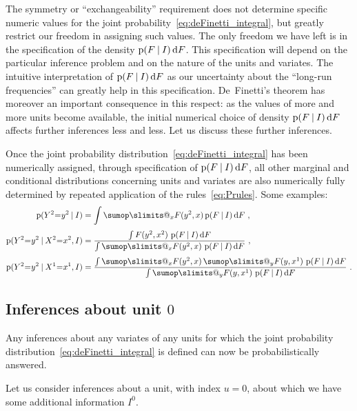 \documentclass[a4paper,12pt,%
onecolumn,oneside,article,%
british%
]{memoir}
\makeatletter
\def\sum{\DOTSI\sumop\slimits@}
\newcommand*{\di}{\mathop{}\!\mathrm{d}}%
\newcommand*{\p}{\mathrm{p}}%
\renewcommand*{\|}[1][]{\nonscript\:#1\vert\nonscript\:\mathopen{}}
\newcommand*{\mo}[1][=]{\mathclose{}\mathord{\nonscript\mkern0.5mu#1\nonscript\mkern0.5mu}\mathopen{}}
\makeatother
\begin{document}
The symmetry or \enquote{exchangeability} requirement does not determine specific numeric values for the joint probability~\eqref{eq:deFinetti_integral}, but greatly restrict our freedom in assigning such values. The only freedom we have left is in the specification of the density $\p(F  \|I) \di F$. This specification will depend on the particular inference problem and on the nature of the units and variates. The intuitive interpretation of $\p(F  \|I) \di F$ as our uncertainty about the \enquote{long-run frequencies} can greatly help in this specification. De~Finetti's theorem has moreover an important consequence in this respect: as the values of more and more units become available, the initial numerical choice of density $\p(F  \|I) \di F$ affects further inferences less and less. Let us discuss these further inferences.

Once the joint probability distribution~\eqref{eq:deFinetti_integral} has been numerically assigned, through specification of $\p(F  \|I) \di F$, all other marginal and conditional distributions concerning units and variates are also numerically fully determined by repeated application of the rules~\eqref{eq:Prules}. Some examples:
\begin{subequations}
    \label{eq:further_infs}
  \begin{align}
    \p(Y^{2}\mo y^{2} \|I) &=
    \int
    \sum_{x}F(y^{2},x)\,\p(F  \|I) \di F \ ,
    \\[\jot]
    \p(Y^{2}\mo y^{2} \| X^{2}\mo x^{2}, I) &=
    \frac{\int F(y^{2},x^{2})\ \p(F  \|I) \di F}{
      \int \sum_{x}F(y^{2},x)\ \p(F  \|I) \di F
    } \ ,
    \\[\jot]
    \p(Y^{2}\mo y^{2} \| X^{1}\mo x^{1}, I) &=
    \frac{\int \sum_{x}F(y^{2},x)\, \sum_{y}F(y,x^{1})\  \p(F  \|I) \di F}{
      \int \sum_{y}F(y,x^{1})\  \p(F  \|I) \di F
    } \ .
  \end{align}
\end{subequations}


\subsection{Inferences about unit $0$}
\label{sec:unit0}

Any inferences about any variates of any units for which the joint probability distribution~\eqref{eq:deFinetti_integral} is defined can now be probabilistically answered.

Let us consider inferences about a unit, with index $u=0$, about which we have some additional information $I^{0}$.
\end{document}
